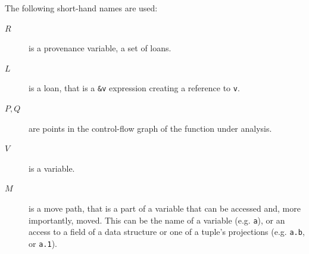 \documentclass[11pt,a4paper,twoside,openany,draft]{report}
\newcommand{\InRust}[1]{\texttt{#1}}
\begin{document}
The following short-hand names are used:
\begin{description}
\item[$R$] is a provenance variable, a set of loans.
\item[$L$] is a loan, that is a \InRust{&v} expression creating a reference
  to \InRust{v}.
\item[$P, Q$] are points in the control-flow graph of the function under analysis.
\item[$V$] is a variable.
\item[$M$] is a move path, that is a part of a variable that can be accessed
  and, more importantly, moved. This can be the name of a variable (e.g.
  \InRust{a}), or an access to a field of a data structure or one of a tuple's
  projections (e.g. \InRust{a.b}, or \InRust{a.1}).
\end{description}
\end{document}
